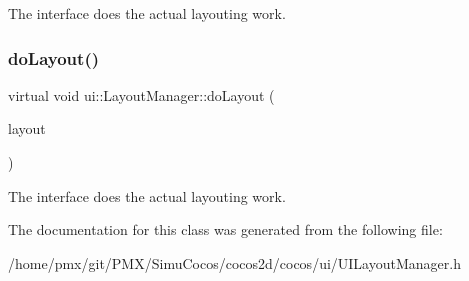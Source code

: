 The interface does the actual layouting work. \mbox{\label{classui_1_1LayoutManager_a2600dc52b52f149b658a9be1bbe00958}} 
\subsubsection{\texorpdfstring{do\+Layout()}{doLayout()}\hspace{0.1cm}{\footnotesize\ttfamily [2/2]}}
{\footnotesize\ttfamily virtual void ui\+::\+Layout\+Manager\+::do\+Layout (\begin{DoxyParamCaption}\item[{\hyperlink{classui_1_1LayoutProtocol}{Layout\+Protocol} $\ast$}]{layout }\end{DoxyParamCaption})\hspace{0.3cm}{\ttfamily [pure virtual]}}

The interface does the actual layouting work. 

The documentation for this class was generated from the following file\+:\begin{DoxyCompactItemize}
\item 
/home/pmx/git/\+P\+M\+X/\+Simu\+Cocos/cocos2d/cocos/ui/U\+I\+Layout\+Manager.\+h\end{DoxyCompactItemize}

